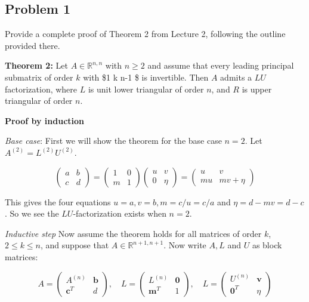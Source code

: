 \documentclass[11pt]{article}
\begin{document}
    \subsection{Problem 1}\label{problem-1}

Provide a complete proof of Theorem 2 from Lecture 2, following the
outline provided there.

    \textbf{Theorem 2:} Let \(A \in \mathbb{R}^{n,n}\) with \(n \geq2\) and
assume that every leading principal submatrix of order \(k\) with \$1
\leq k \leq n-1 \$ is invertible. Then \(A\) admits a \(LU\)
factorization, where \(L\) is unit lower triangular of order \(n\), and
\(R\) is upper triangular of order \(n\).

\textbf{Proof by induction}

\emph{Base case}: First we will show the theorem for the base case
\(n = 2\). Let \(A^{(2)} = L^{(2)}U^{(2)}\).

\[
\begin{pmatrix} 
a & b \\
c & d 
\end{pmatrix} = 
\begin{pmatrix} 
1 & 0 \\
m & 1 
\end{pmatrix}
\begin{pmatrix} 
u & v \\
0 & \eta
\end{pmatrix} =
\begin{pmatrix} 
u & v \\
mu & mv + \eta
\end{pmatrix}
\]

This gives the four equations \(u = a, v = b, m = c/u = c/a\) and
\(\eta = d - mv = d - c\). So we see the \(LU\)-factorization exists
when \(n = 2\).

\emph{Inductive step} Now assume the theorem holds for all matrices of
order \(k\), \(2 \leq k \leq n\), and suppose that
\(A\in \mathbb{R}^{n+1, n+1}\). Now write \(A, L\) and \(U\) as block
matrices:

\[
A= 
\begin{pmatrix} 
A^{(n)} & \mathbf{b} \\
\mathbf{c}^T & d 
\end{pmatrix}, \quad
L = 
\begin{pmatrix} 
L^{(n)} & \mathbf{0} \\
\mathbf{m}^T & 1 
\end{pmatrix}, \quad
L = 
\begin{pmatrix} 
U^{(n)} & \mathbf{v} \\
\mathbf{0}^T & \eta 
\end{pmatrix}
\]
\end{document}
